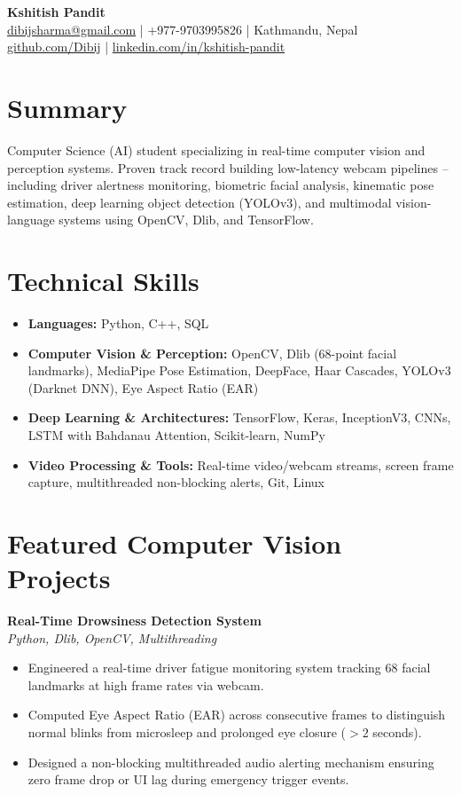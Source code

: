 \documentclass[a4paper,10pt]{article}
\begin{document}
\begin{center}
    {\LARGE \textbf{Kshitish Pandit}} \\[4pt]
    \href{mailto:dibijsharma@gmail.com}{dibijsharma@gmail.com} \quad | \quad +977-9703995826 \quad | \quad Kathmandu, Nepal \\[2pt]
    \href{https://github.com/Dibij}{github.com/Dibij} \quad | \quad
    \href{https://www.linkedin.com/in/kshitish-pandit}{linkedin.com/in/kshitish-pandit}
\end{center}

\vspace{2pt}

\section*{Summary}
Computer Science (AI) student specializing in real-time computer vision and perception systems. Proven track record building low-latency webcam pipelines -- including driver alertness monitoring, biometric facial analysis, kinematic pose estimation, deep learning object detection (YOLOv3), and multimodal vision-language systems using OpenCV, Dlib, and TensorFlow.

\section*{Technical Skills}
\begin{itemize}
    \item \textbf{Languages:} Python, C++, SQL
    \item \textbf{Computer Vision \& Perception:} OpenCV, Dlib (68-point facial landmarks), MediaPipe Pose Estimation, DeepFace, Haar Cascades, YOLOv3 (Darknet DNN), Eye Aspect Ratio (EAR)
    \item \textbf{Deep Learning \& Architectures:} TensorFlow, Keras, InceptionV3, CNNs, LSTM with Bahdanau Attention, Scikit-learn, NumPy
    \item \textbf{Video Processing \& Tools:} Real-time video/webcam streams, screen frame capture, multithreaded non-blocking alerts, Git, Linux
\end{itemize}

\section*{Featured Computer Vision Projects}

\textbf{Real-Time Drowsiness Detection System} \\
\textit{Python, Dlib, OpenCV, Multithreading}
\begin{itemize}
    \item Engineered a real-time driver fatigue monitoring system tracking 68 facial landmarks at high frame rates via webcam.
    \item Computed Eye Aspect Ratio (EAR) across consecutive frames to distinguish normal blinks from microsleep and prolonged eye closure ($>2$ seconds).
    \item Designed a non-blocking multithreaded audio alerting mechanism ensuring zero frame drop or UI lag during emergency trigger events.
\end{itemize}
\end{document}
